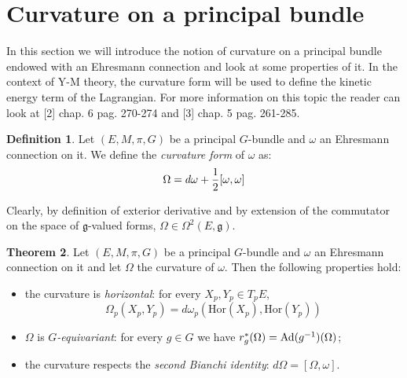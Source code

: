 \documentclass[12pt,a4paper]{report}
\theoremstyle{definition}
\newtheorem{Def}{Definition}[chapter]
\theoremstyle{Theorem}
\newtheorem{Theo}[Def]{Theorem}
\theoremstyle{definition}
\theoremstyle{definition}
\begin{document}
	\section{Curvature on a principal bundle}
	In this section we will introduce the notion of curvature on a principal bundle endowed with an Ehresmann connection and look at some properties of it. In the context of Y-M theory, the curvature form will be used to define the kinetic energy term of the Lagrangian. For more information on this topic the reader can look at [2] chap. 6 pag. 270-274 and [3] chap. 5 pag. 261-285.
	\begin{Def}
		Let $(E,M,\pi,G)$ be a principal $G$-bundle and $\omega$ an Ehresmann connection on it. We define the \textit{curvature form} of $\omega$ as:
		$$\Omega=d\omega+{1\over 2}[\omega,\omega]$$
	\end{Def}
	Clearly, by definition of exterior derivative and by extension of the commutator on the space of $\mathfrak{g}$-valued forms, $\Omega\in \Omega^2(E,\mathfrak{g})$. 
	\begin{Theo}\label{Theo_5.5.1}
		Let $(E,M,\pi,G)$ be a principal $G$-bundle and $\omega$ an Ehresmann connection on it and let $\Omega$ the curvature of $\omega$. Then the following properties hold:
		\begin{itemize}
			\item the curvature is \textit{horizontal}: for every $X_p,Y_p\in T_pE$,
			$$\Omega_p(X_p,Y_p)=d\omega_p(\mathrm{Hor}(X_p),\mathrm{Hor}(Y_p))$$
			\item $\Omega$ is \textit{$G$-equivariant}: for every $g\in G$ we have $r^*_g(\Omega)=\hbox{Ad}(g^{-1})(\Omega)$;
			\item the curvature respects the \textit{second Bianchi identity}: $d\Omega=[\Omega,\omega]$.
		\end{itemize}
	\end{Theo}
\end{document}
